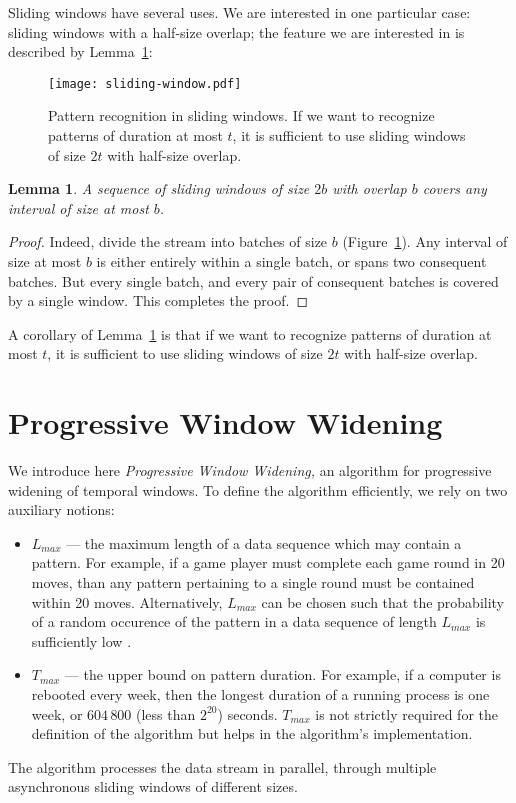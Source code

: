 \documentclass[runningheads,a4paper]{llncs}
\newtheorem{lmm}{Lemma}
\begin{document}
Sliding windows have several uses. We are interested in one
particular case: sliding windows with a half-size overlap; the
feature we are interested in is described by Lemma~\ref{lmm:sliding}:
\begin{figure}
    \centering
	\texttt{[image: sliding-window.pdf]}
	\caption{Pattern recognition in sliding windows. If we want to
recognize patterns of duration at most $t$, it is sufficient to use
sliding windows of size $2t$ with half-size overlap.}
    \label{fig:sliding-window}
\end{figure}
\begin{lmm}
    \label{lmm:sliding}
A sequence of sliding windows of size $2b$ with overlap $b$
covers any interval of size at most $b$.
\end{lmm}
\begin{proof}
    Indeed, divide the stream into batches of size $b$
    (Figure~\ref{fig:sliding-window}). Any
    interval of size at most  $b$ is either entirely within a
    single batch, or spans two consequent batches. But every
    single batch, and every pair of consequent batches is
    covered by a single window. This completes the proof.
\end{proof}
A corollary of Lemma~\ref{lmm:sliding} is that if we want to
recognize patterns of duration at most $t$, it is sufficient to use
sliding windows of size $2t$ with half-size overlap.

\section{Progressive Window Widening}
\label{sec:pww}

We introduce here \textit{Progressive Window Widening,} an
algorithm for progressive widening of temporal windows. To
define the algorithm efficiently, we rely on two auxiliary
notions:
\begin{itemize}
	\item $L_{max}$ --- the maximum length of a data sequence which 
		may contain a pattern. For example, if a game player must
		complete each game round in 20 moves, than any pattern
		pertaining to a single round must be contained within 20
		moves. Alternatively, $L_{max}$ can be chosen such that
		the probability of a random occurence of the pattern
		in a data sequence of length $L_{max}$ is sufficiently
		low \cite{GAS03}.
    \item $T_{max}$ --- the upper bound on pattern duration.
        For example, if a computer is rebooted every week, then
        the longest duration of a running process is one week,
        or $604\,800$ (less than $2^{20}$) seconds. $T_{max}$ 
        is not strictly required for the definition of the
        algorithm but helps in the algorithm's implementation.
\end{itemize}
The algorithm processes the data stream in parallel, through
multiple asynchronous sliding windows of different sizes.
\end{document}
